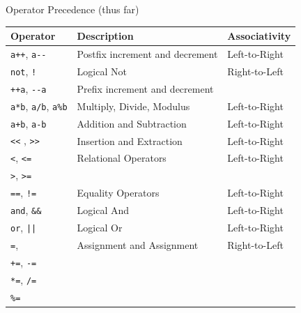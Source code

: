 \documentclass[handout]{beamer}
\begin{document}
\begin{frame}[fragile]{Operator Precedence (thus far)}
  \begin{adjustbox}{max totalheight=0.8\textheight}
    \begin{tabular}{|l|l|l|}
        \hline
        \textbf{Operator} & \textbf{Description} & \textbf{Associativity} \\
        \hline
        \texttt{a++}, \verb#a--# & Postfix increment and decrement & Left-to-Right\\
        \hline
        \texttt{not}, \texttt{!} & Logical Not & Right-to-Left\\
        \texttt{++a}, \verb#--a# & Prefix increment and decrement &  \\
        \hline
        \texttt{a*b}, \texttt{a/b}, \texttt{a\%b} & Multiply, Divide, Modulus & Left-to-Right\\
        \hline
        \texttt{a+b}, \texttt{a-b} & Addition and Subtraction & Left-to-Right\\
        \hline
        \texttt{<<} , \texttt{>>} & Insertion and Extraction & Left-to-Right \\
        \hline
        \texttt{<}, \texttt{<=} & Relational Operators & Left-to-Right\\
        \texttt{>}, \texttt{>=} & & \\
        \hline
        \texttt{==}, \texttt{!=} & Equality Operators & Left-to-Right\\
        \hline
        \texttt{and}, \texttt{\&\&} & Logical And & Left-to-Right\\
        \hline
        \texttt{or}, \texttt{||} & Logical Or & Left-to-Right\\
        \hline
        \texttt{=},  & Assignment and Assignment & Right-to-Left \\
        \texttt{+=}, \texttt{-=} & & \\
        \texttt{*=}, \texttt{/=} & & \\
        \texttt{\%=} & & \\
        \hline
    \end{tabular}
  \end{adjustbox}
\end{frame}
\end{document}

